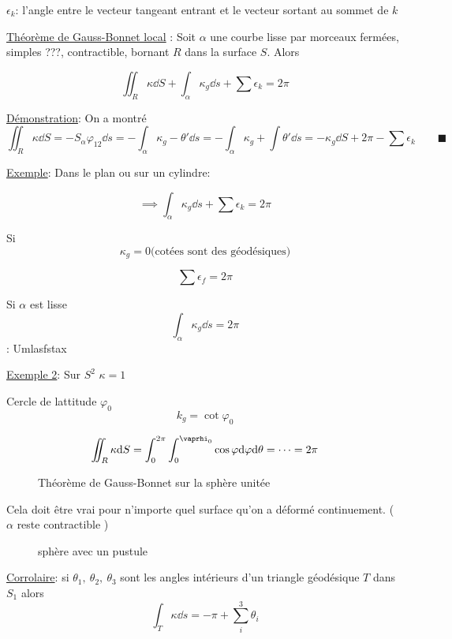 $\epsilon_k$: l'angle entre le vecteur tangeant entrant et le vecteur sortant au sommet de $k$

\underline{Théorème de Gauss-Bonnet local} : Soit $\alpha$ une courbe lisse par morceaux fermées, simples ???, contractible, bornant $R$ dans la surface $S$. Alors 

$$\iint_R \kappa \dd S + \int_{\alpha} \kappa_g \dd s  + \sum \epsilon_k = 2\pi$$ 

\underline{Démonstration}: On a montré $$\iint_R \kappa \dd S = -S_{\alpha} \varphi_{12} \dd s = -\int_{\alpha} \kappa_g -\theta' \dd s = -\int_{\alpha} \kappa_g + \int \theta' \dd s = -\kappa_g \dd S + 2\pi -\sum \epsilon_k \qquad \blacksquare$$  

\underline{Exemple}: Dans le plan ou sur un cylindre:

$$\implies \int_{\alpha} \kappa_g \dd s + \sum \epsilon_k = 2\pi$$ 

Si $$ \kappa_g = 0 \text{(cotées sont des géodésiques)} $$

$$\sum \epsilon_f = 2\pi$$ 


Si $\alpha$ est lisse $$\int_{\alpha} \kappa_g \dd s = 2\pi$$ : Umlasfstax  


\underline{Exemple 2}: Sur $S^2$ $\kappa = 1$

Cercle de lattitude $\varphi_0$
$$k_g = \cot \varphi_0	$$ 

$$\iint_R \kappa \dd S = \int_0^{2\pi} \int_0^{\vaprhi_0} \cos \varphi \dd \varphi \dd \theta = \dotsb = 2\pi$$ 

\begin{figure}[ht]
    \centering
    \caption{Théorème de Gauss-Bonnet sur la sphère unitée}
    \label{fig:théorème-de-gauss-bonnet-sur-la-sphère-unitée}
\end{figure}

Cela doit être vrai pour n'importe quel surface qu'on a déformé continuement. ( $\alpha$ reste contractible )

\begin{figure}[ht]
    \centering
    \caption{sphère avec un pustule}
    \label{fig:sphère-avec-un-pustule}
\end{figure}

\underline{Corrolaire}: si $\theta_1 , \ \theta_2 ,\ \theta_3$ sont les angles intérieurs d'un triangle géodésique $T$ dans $S_1$ alors $$\int_T \kappa \dd s = -\pi + \sum_i^3  \theta_i$$ 


